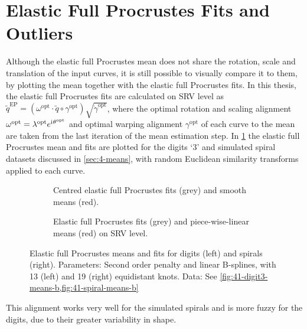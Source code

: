 \section{Elastic Full Procrustes Fits and Outliers}
\label{sec:4-pfits}
Although the elastic full Procrustes mean does not share the rotation, scale and translation of the input curves, it is still possible to visually compare it to them, by plotting the mean together with the elastic full Procrustes fits.
In this thesis, the elastic full Procrustes fits are calculated on SRV level as $\widetilde q^\mathrm{EP} = (\omega^\mathrm{opt}\cdot \widetilde q \circ \gamma^\mathrm{opt} ) \sqrt{\dot\gamma^\mathrm{opt}}$, where the optimal rotation and scaling alignment $\omega^\mathrm{opt} = \lambda^\mathrm{opt} e^{\mathrm{i}\mkern1mu \theta^\mathrm{opt}}$ and optimal warping alignment $\gamma^\mathrm{opt}$ of each curve to the mean are taken from the last iteration of the mean estimation step.
In \cref{fig:4-pfits-curve} the elastic full Procrustes mean and fits are plotted for the digits \enquote*{3} and simulated spiral datasets discussed in \cref{sec:4-means}, with random Euclidean similarity transforms applied to each curve.
\begin{figure}
  \centering
  \begin{subfigure}{\textwidth}
    \begin{subfigure}{0.48\textwidth}
    \end{subfigure}\hfill%
    \begin{subfigure}{0.48\textwidth}
    \end{subfigure}
    \caption{Centred elastic full Procrustes fits (grey) and smooth means (red).}
    \label{fig:4-pfits-curve}
  \end{subfigure}
  \begin{subfigure}{\textwidth}
    \begin{subfigure}{0.48\textwidth}
    \end{subfigure}\hfill%
    \begin{subfigure}{0.48\textwidth}
    \end{subfigure}
    \caption{Elastic full Procrustes fits (grey) and piece-wise-linear means (red) on SRV level.}
    \label{fig:4-pfits-srv}
  \end{subfigure}
  \caption{Elastic full Procrustes means and fits for digits (left) and spirals (right). Parameters: Second order penalty and linear B-splines, with 13 (left) and 19 (right) equidistant knots. Data: See \cref{fig:41-digit3-means-b,fig:41-spiral-means-b}}
  \label{fig:4-pfits}
\end{figure}
This alignment works very well for the simulated spirals and is more fuzzy for the digits, due to their greater variability in shape. 

